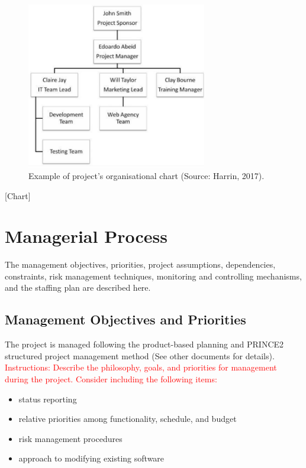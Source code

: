 \documentclass{article}
\begin{document}
\begin{figure}[h]
  \centering
  \includegraphics[width=0.7\textwidth]{harrin_2017.png}
  \caption{ Example of project's organisational chart (Source: Harrin, 2017).}
  \label{harrin}
\end{figure}


[Chart]

\section{Managerial Process}
The management objectives, priorities, project assumptions, dependencies, constraints, risk management techniques, monitoring and controlling mechanisms, and the staffing plan are described here.




\subsection{Management Objectives and Priorities}
The project is managed following the product-based planning and PRINCE2
structured project management method (See other documents for details).
\textcolor{red}{Instructions: Describe the philosophy, goals, and priorities for management
during the project. Consider including the following items:}

\begin{itemize}
\item {\color{red}status reporting}
\item {\color{red}relative priorities among functionality, schedule, and budget}
\item {\color{red}risk management procedures}
\item {\color{red}approach to modifying existing software}
\end{itemize}
\end{document}
